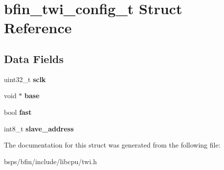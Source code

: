 \hypertarget{structbfin__twi__config__t}{}\section{bfin\+\_\+twi\+\_\+config\+\_\+t Struct Reference}
\label{structbfin__twi__config__t}
\subsection*{Data Fields}
\begin{DoxyCompactItemize}
\item 
\mbox{\label{structbfin__twi__config__t_af16c0488e8c7335412cdee9bd0b80db4}} 
uint32\+\_\+t {\bfseries sclk}
\item 
\mbox{\label{structbfin__twi__config__t_a94e9124cfa443575629bf2325c486a62}} 
void $\ast$ {\bfseries base}
\item 
\mbox{\label{structbfin__twi__config__t_a612d8103f8acaf4ee1a4b480fd4a1b29}} 
bool {\bfseries fast}
\item 
\mbox{\label{structbfin__twi__config__t_a03935e023cbc10981e306f7cb4d3771d}} 
int8\+\_\+t {\bfseries slave\+\_\+address}
\end{DoxyCompactItemize}


The documentation for this struct was generated from the following file\+:\begin{DoxyCompactItemize}
\item 
bsps/bfin/include/libcpu/twi.\+h\end{DoxyCompactItemize}
